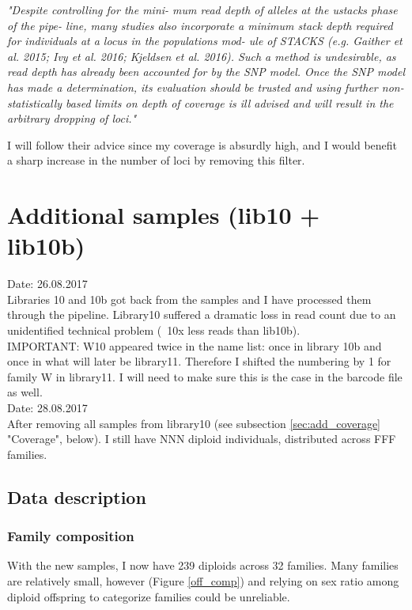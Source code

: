\documentclass[10pt,a4paper]{report}
\begin{document}
\textit{"Despite controlling for the mini-
mum read depth of alleles at the ustacks phase of the pipe-
line, many studies also incorporate a minimum stack depth
required for individuals at a locus in the populations mod-
ule of STACKS (e.g. Gaither et al. 2015; Ivy et al. 2016; Kjeldsen
et al. 2016). Such a method is undesirable, as read depth has
already been accounted for by the SNP model. Once the SNP
model has made a determination, its evaluation should be
trusted and using further non-statistically based limits on
depth of coverage is ill advised and will result in the arbitrary
dropping of loci."\\}

I will follow their advice since my coverage is absurdly high, and I would benefit a sharp increase in the number of loci by removing this filter. 

\chapter{Additional samples (lib10 + lib10b)}

Date: 26.08.2017\\
Libraries 10 and 10b got back from the samples and I have processed them through the pipeline. Library10 suffered a dramatic loss in read count due to an unidentified technical problem (~10x less reads than lib10b).\\
IMPORTANT: W10 appeared twice in the name list: once in library 10b and once in what will later be library11. Therefore I shifted the numbering by 1 for family W in library11. I will need to make sure this is the case in the barcode file as well.\\

Date: 28.08.2017\\
After removing all samples from library10 (see subsection \ref{sec:add_coverage} "Coverage", below). I still have NNN diploid individuals, distributed across FFF families.

\section{Data description}
\subsection{Family composition}
With the new samples, I now have 239 diploids across 32 families. Many families are relatively small, however (Figure \ref{off_comp}) and relying on sex ratio among diploid offspring to categorize families could be unreliable.
\end{document}
